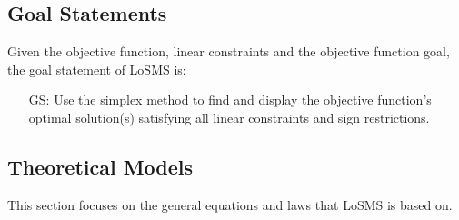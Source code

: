 \documentclass[12pt]{article}
\newcounter{goalnum} %
\newcommand{\famname}{LoSMS} %
\begin{document}
\subsection{Goal Statements}

\noindent Given the objective function, linear constraints and the objective 
function goal, the goal statement of \famname{} is: 

\begin{itemize}
	\item[GS\refstepcounter{goalnum}\thegoalnum \label{goalStatement}:] Use the 
	simplex method to find and display the objective function's optimal 
	solution(s) satisfying all linear constraints and sign restrictions.
\end{itemize}

\subsection{Theoretical Models} \label{sec_theoretical}

This section focuses on the general equations and laws that \famname{} is based
on.

~\newline
\end{document}
